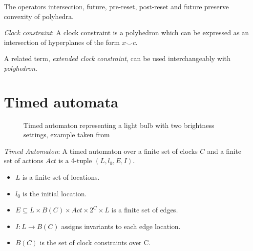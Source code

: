 \documentclass[a4paper]{llncs}
\begin{document}
The operators intersection, future, pre-reset, post-reset and future
preserve convexity of polyhedra.

\begin{definition}
\emph{Clock constraint}: A clock constraint is a polyhedron which can
be expressed as an intersection of hyperplanes of the form $x \smile
c$.
\end{definition}

A related term, \emph{extended clock constraint}, can be used
interchangeably with \emph{polyhedron}.

\section{Timed automata}

\begin{SCfigure}
  \centering

  \caption{Timed automaton representing a light bulb with two
    brightness settings, example taken from \cite{aceto2007reactive}}
\end{SCfigure}

\begin{definition}
  \emph{Timed Automaton}: A timed automaton
  \cite{Alur94atheory} over a finite set of clocks $C$
  and a finite set of actions $Act$ is a 4-tuple $(L, l_{0}, E, I)$.
  \begin{itemize}
  \item $L$ is a finite set of locations.
  \item $l_{0}$ is the initial location.
  \item $E \subseteq L \times B(C) \times Act \times 2^{C} \times L$
    is a finite set of edges.
  \item $I: L \rightarrow B(C)$ assigns invariants to each edge
    location.
  \item $B(C)$ is the set of clock constraints over C.
  \end{itemize}
\end{definition}
\end{document}
